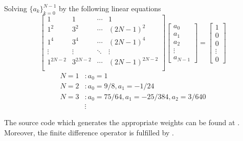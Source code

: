 \documentclass[11pt]{article}
\theoremstyle{plain}
\theoremstyle{definition}
\theoremstyle{remark}
\numberwithin{equation}{section}
\begin{document}
Solving $\{a_k\}_{k=0}^{N-1}$ by the following linear equations
\begin{equation*}
\begin{bmatrix}
  1 & 1 & \cdots & 1 \\
  1^2 & 3^2 & \cdots & (2N-1)^2 \\
  1^4 & 3^4 & \cdots & (2N-1)^4 \\
  \vdots & \vdots & \ddots & \vdots \\
  1^{2N-2} & 3^{2N-2} & \cdots & (2N-1)^{2N-2} \\
\end{bmatrix}
\begin{bmatrix}
  a_0 \\ a_1 \\ a_2 \\ \vdots \\ a_{N-1}
\end{bmatrix}
=
\begin{bmatrix}
  1 \\ 0 \\ 0 \\ \vdots \\ 0
\end{bmatrix}
\end{equation*}
\begin{equation*}
  \begin{aligned}
  N = 1&: a_0 = 1\\
  N = 2&: a_0 = 9/8, a_1 = -1/24\\
  N = 3&: a_0 = 75/64, a_1 = -25/384, a_2 = 3/640\\
  &\vdots
  \end{aligned}
\end{equation*}

The source code which generates the appropriate weights can be found at . Moreover, the finite difference operator is fulfilled by . 
\end{document}
